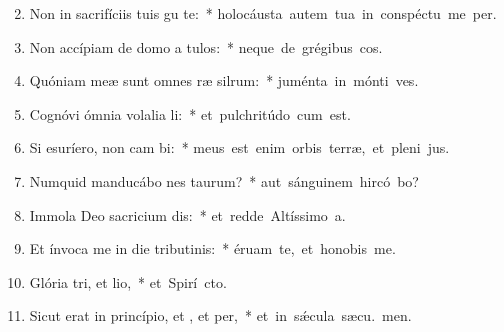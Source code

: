 \begin{flushleft}
\begin{enumerate}[leftmargin=*]
\setcounter{enumi}{1}

\item Non in sacrifíciis tuis gu te:~* \mbox{holocáusta autem tua in conspéctu me  per.}
\item Non accípiam de domo a tulos:~* \mbox{neque de grégibus  cos.}
\item Quóniam meæ sunt omnes ræ silrum:~* \mbox{juménta in mónti  ves.}
\item Cognóvi ómnia volalia li:~* \mbox{et pulchritúdo  cum est.}
\item Si esuríero, non cam bi:~* \mbox{meus est enim orbis terræ, et pleni jus.}
\item Numquid manducábo nes taurum?~* \mbox{aut sánguinem hircó bo?}
\item Immola Deo sacricium dis:~* \mbox{et redde Altíssimo  a.}
\item Et ínvoca me in die tributinis:~* \mbox{éruam te, et honobis me.}
\item Glória tri, et lio,~* \mbox{et Spirí cto.}
\item Sicut erat in princípio, et , et per,~* \mbox{et in s\'{\ae}cula sæcu. men.}

\end{enumerate}
\end{flushleft}

